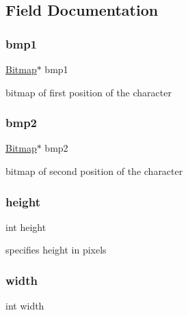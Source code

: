 \subsection{Field Documentation}
\mbox{\label{struct_character_ace0800db034f28906f5865a455ffe263}} 
\subsubsection{\texorpdfstring{bmp1}{bmp1}}
{\footnotesize\ttfamily \hyperlink{struct_bitmap}{Bitmap}$\ast$ bmp1}



bitmap of first position of the character 

\mbox{\label{struct_character_a7610f0716dcba2fee8823ea505b09e00}} 
\subsubsection{\texorpdfstring{bmp2}{bmp2}}
{\footnotesize\ttfamily \hyperlink{struct_bitmap}{Bitmap}$\ast$ bmp2}



bitmap of second position of the character 

\mbox{\label{struct_character_ad12fc34ce789bce6c8a05d8a17138534}} 
\subsubsection{\texorpdfstring{height}{height}}
{\footnotesize\ttfamily int height}



specifies height in pixels 

\mbox{\label{struct_character_a2474a5474cbff19523a51eb1de01cda4}} 
\subsubsection{\texorpdfstring{width}{width}}
{\footnotesize\ttfamily int width}



